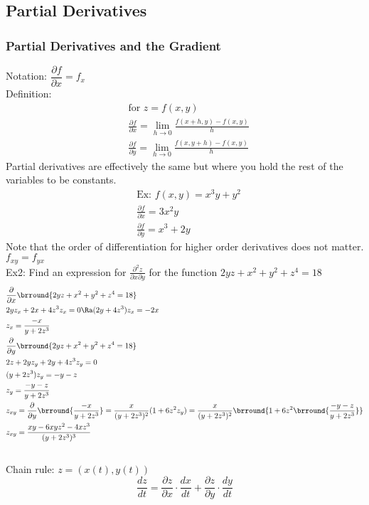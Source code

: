 \subsection{Partial Derivatives}

\subsubsection{Partial Derivatives and the Gradient}
Notation: $\dfrac{\partial f}{\partial x}=f_x$\\
Definition:
\begin{align*}
    &\text{for }z=f(x,y)\\
    &\frac{\partial f}{\partial x}=\lim_{h\to 0}\frac{f(x+h,y)-f(x,y)}{h}\\
    &\frac{\partial f}{\partial y}=\lim_{h\to 0}\frac{f(x,y+h)-f(x,y)}{h}
\end{align*}
Partial derivatives are effectively the same but where you hold the rest of the variables to be constants.
\begin{align*}
    &\text{Ex: }f(x,y)=x^3y+y^2\\
    &\frac{\partial f}{\partial x}=3x^2y\\
    &\frac{\partial f}{\partial y}=x^3+2y
\end{align*}
Note that the order of differentiation for higher order derivatives does not matter. $f_{xy}=f_{yx}$\\
Ex2: Find an expression for $\frac{\partial^2 z}{\partial x\partial y}$ for the function $2yz+x^2+y^2+z^4=18$
\begin{align*}
    &\frac{\partial}{\partial x}\brround{2yz+x^2+y^2+z^4=18}\\
    &2yz_x+2x+4z^3z_x=0\Ra (2y+4z^3)z_x=-2x\\
    &z_x=\frac{-x}{y+2z^3}\\
    &\frac{\partial }{\partial y}\brround{2yz+x^2+y^2+z^4=18}\\
    &2z+2yz_y+2y+4z^3z_y=0\\
    &(y+2z^3)z_y=-y-z\\
    &z_y=\frac{-y-z}{y+2z^3}\\
    &z_{xy}=\frac{\partial}{\partial y}\brround{\frac{-x}{y+2z^3}}=\frac{x}{(y+2z^3)^2}(1+6z^2z_y)=\frac{x}{(y+2z^3)^2}\brround{1+6z^2\brround{\frac{-y-z}{y+2z^3}}}\\
    &z_{xy}=\frac{xy-6xyz^2-4xz^3}{(y+2z^3)^3}
\end{align*}
\\
Chain rule: $z=(x(t),y(t))$
$$\frac{dz}{dt}=\frac{\partial z}{\partial x}\cdot\frac{dx}{dt}+\frac{\partial z}{\partial y}\cdot\frac{dy}{dt}$$
